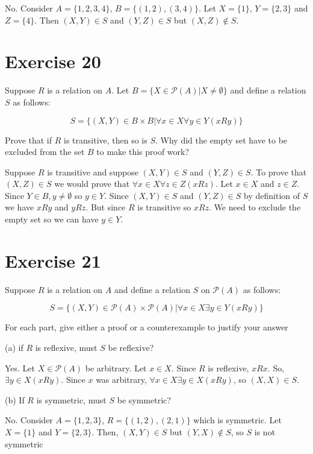 \documentclass[11pt]{article}
\newcommand{\powerset}[1]{\mathscr{P}(#1)}
\begin{document}
No. Consider $A = \{1,2,3,4\}$, $B=\{(1,2), (3,4)\}$. Let $X = \{1\}$, $Y = \{2, 3\}$
and $Z = \{4\}$. Then $(X, Y) \in S$ and $(Y, Z) \in S$ but $(X, Z) \notin S$.

\section*{Exercise 20}

Suppose $R$ is a relation on $A$. Let $B = \{X \in \powerset{A} | X \neq \emptyset \}$
and define a relation $S$ as follows:

$$S = \{(X, Y) \in B \times B | \forall x \in X \forall y \in Y (xRy)\}$$

Prove that if $R$ is transitive, then so is $S$. Why did the empty set have to
be excluded from the set $B$ to make this proof work?

Suppose $R$ is transitive and suppose $(X, Y) \in S$ and $(Y, Z) \in S$. To prove 
that $(X, Z) \in S$ we would prove that $\forall x \in X \forall z \in Z (xRz)$.
Let $x \in X$ and $z \in Z$. Since $Y \in B, y \neq \emptyset$ so $y \in Y$.
Since $(X, Y) \in S$ and $(Y, Z) \in S$ by definition of $S$ we have $xRy$ and 
$yRz$. But since $R$ is transitive so $xRz$. We need to exclude the empty set so 
we can have $y \in Y$.

\section*{Exercise 21}

Suppose $R$ is a relation on $A$ and define a relation $S$ on $\powerset{A}$ as 
follows:

$$S = \{(X, Y) \in \powerset{A} \times \powerset{A} | \forall x \in X \exists y \in Y (xRy)\}$$

For each part, give either a proof or a counterexample to justify your answer

\noindent (a) if $R$ is reflexive, must $S$ be reflexive?

Yes. Let $X \in \powerset{A}$ be arbitrary. Let $x \in X$. Since $R$ is reflexive,
$xRx$. So, $\exists y \in X (xRy)$. Since $x$ was arbitrary, 
$\forall x \in X \exists y \in X (xRy)$, so $(X, X) \in S$.

\noindent (b) If $R$ is symmetric, must $S$ be symmetric?

No. Consider $A = \{1,2,3\}$, $R = \{(1,2), (2, 1)\}$ which is symmetric. 
Let $X = \{1\}$ and $Y = \{2, 3\}$. Then, $(X, Y) \in S$ but $(Y, X) \notin S$,
so $S$ is not symmetric
\end{document}
